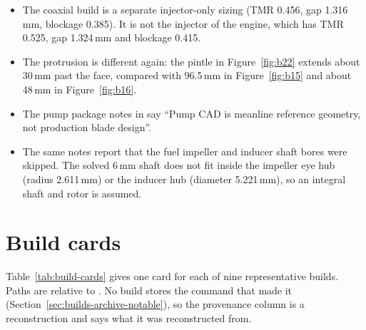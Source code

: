 \begin{itemize}
\item The coaxial build is a separate injector-only sizing (TMR 0.456, gap 1.316\,mm, blockage 0.385). It is not the injector of the  engine, which has TMR 0.525, gap 1.324\,mm and blockage 0.415.
\item The protrusion is different again: the pintle in Figure~\ref{fig:b22} extends about 30\,mm past the face, compared with 96.5\,mm in Figure~\ref{fig:b15} and about 48\,mm in Figure~\ref{fig:b16}.
\item The pump package notes in  say ``Pump CAD is meanline reference geometry, not production blade design''.
\item The same notes report that the fuel impeller and inducer shaft bores were skipped. The solved 6\,mm shaft does not fit inside the impeller eye hub (radius 2.611\,mm) or the inducer hub (diameter 5.221\,mm), so an integral shaft and rotor is assumed.
\end{itemize}

\section{Build cards}\label{sec:build-cards}

Table~\ref{tab:build-cards} gives one card for each of nine representative builds. Paths are relative to . No build stores the command that made it (Section~\ref{sec:builds-archive-notable}), so the provenance column is a reconstruction and says what it was reconstructed from.

